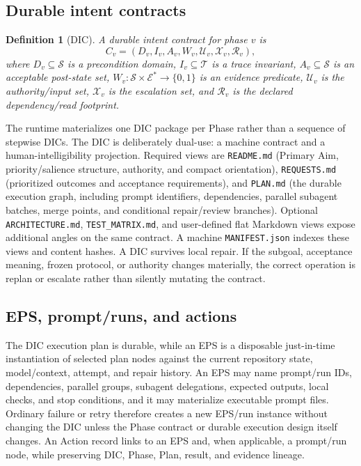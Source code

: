 \documentclass[11pt,a4paper]{article}
\newtheorem{definition}{Definition}[section]
\newcommand{\State}{\mathcal S}
\newcommand{\Trace}{\mathcal T}
\newcommand{\Evidence}{\mathcal E}
\begin{document}
\subsection{Durable intent contracts}
\begin{definition}[DIC]
A durable intent contract for phase $v$ is
\[
C_v=(D_v,I_v,A_v,W_v,\mathcal U_v,\mathcal X_v,\mathcal R_v),
\]
where $D_v\subseteq\State$ is a precondition domain, $I_v\subseteq\Trace$ is a trace invariant, $A_v\subseteq\State$ is an acceptable post-state set, $W_v:\State\times\Evidence^*\to\{0,1\}$ is an evidence predicate, $\mathcal U_v$ is the authority/input set, $\mathcal X_v$ is the escalation set, and $\mathcal R_v$ is the declared dependency/read footprint.
\end{definition}
The runtime materializes one DIC package per Phase rather than a sequence of stepwise DICs. The DIC is deliberately dual-use: a machine contract and a human-intelligibility projection. Required views are \texttt{README.md} (Primary Aim, priority/salience structure, authority, and compact orientation), \texttt{REQUESTS.md} (prioritized outcomes and acceptance requirements), and \texttt{PLAN.md} (the durable execution graph, including prompt identifiers, dependencies, parallel subagent batches, merge points, and conditional repair/review branches). Optional \texttt{ARCHITECTURE.md}, \texttt{TEST\_MATRIX.md}, and user-defined flat Markdown views expose additional angles on the same contract. A machine \texttt{MANIFEST.json} indexes these views and content hashes. A DIC survives local repair. If the subgoal, acceptance meaning, frozen protocol, or authority changes materially, the correct operation is replan or escalate rather than silently mutating the contract.

\subsection{EPS, prompt/runs, and actions}
The DIC execution plan is durable, while an EPS is a disposable just-in-time instantiation of selected plan nodes against the current repository state, model/context, attempt, and repair history. An EPS may name prompt/run IDs, dependencies, parallel groups, subagent delegations, expected outputs, local checks, and stop conditions, and it may materialize executable prompt files. Ordinary failure or retry therefore creates a new EPS/run instance without changing the DIC unless the Phase contract or durable execution design itself changes. An Action record links to an EPS and, when applicable, a prompt/run node, while preserving DIC, Phase, Plan, result, and evidence lineage.
\end{document}
